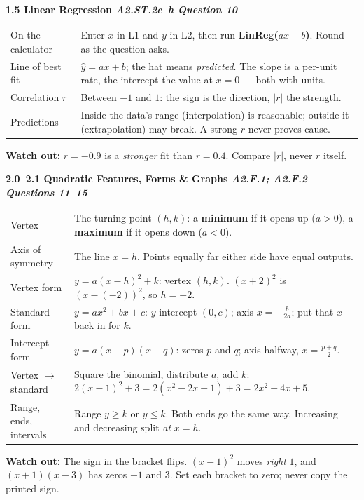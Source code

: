 \documentclass[10pt]{article}
\newcommand{\sghead}[2]{%
  \boxguard[10]%
  \vspace{4pt}\par\noindent
  \colorbox{forest}{\parbox{\dimexpr\linewidth-2\fboxsep}{%
    \small\color{white}\bfseries #1 \hfill \textmd{\itshape\scriptsize\color{forestmid} #2}}}%
  \vspace{2pt}\par}
\newcommand{\sgwatch}[1]{%
  \vspace{1pt}\par\noindent
  \colorbox{redbg}{\parbox{\dimexpr\linewidth-2\fboxsep}{%
    \footnotesize\textbf{\textcolor{redacc}{Watch out:}} #1}}%
  \vspace{1pt}\par}
\newcommand{\sgtabsetup}{\renewcommand{\arraystretch}{1.06}\footnotesize}
\begin{document}
\sghead{1.5 \quad Linear Regression}{A2.ST.2c--h \;\textbullet\; Question 10}
{\sgtabsetup
\begin{tabularx}{\linewidth}{@{} G X @{}}
On the calculator & Enter $x$ in L1 and $y$ in L2, then run \textbf{LinReg($ax+b$)}. Round as the
  question asks. \\
Line of best fit & $\hat y = ax+b$; the hat means \emph{predicted}. The slope is a per-unit rate,
  the intercept the value at $x=0$ --- both with units. \\
Correlation $r$ & Between $-1$ and $1$: the sign is the direction, $|r|$ the strength. \\
Predictions & Inside the data's range (interpolation) is reasonable; outside it (extrapolation)
  may break. A strong $r$ never proves cause. \\
\end{tabularx}}
\sgwatch{$r=-0.9$ is a \emph{stronger} fit than $r=0.4$. Compare $|r|$, never $r$ itself.}

\sghead{2.0--2.1 \quad Quadratic Features, Forms \& Graphs}{A2.F.1; A2.F.2 \;\textbullet\; Questions 11--15}
{\sgtabsetup
\begin{tabularx}{\linewidth}{@{} G X @{}}
Vertex & The turning point $(h,k)$: a \textbf{minimum} if it opens up ($a>0$), a
  \textbf{maximum} if it opens down ($a<0$). \\
Axis of symmetry & The line $x=h$. Points equally far either side have equal outputs. \\
Vertex form & $y=a(x-h)^2+k$: vertex $(h,k)$. $(x+2)^2$ is $(x-(-2))^2$, so $h=-2$. \\
Standard form & $y=ax^2+bx+c$: $y$-intercept $(0,c)$; axis $x=-\frac{b}{2a}$; put that $x$ back in
  for $k$. \\
Intercept form & $y=a(x-p)(x-q)$: zeros $p$ and $q$; axis halfway, $x=\frac{p+q}{2}$. \\
Vertex $\to$ standard & Square the binomial, distribute $a$, add $k$:
  $2(x-1)^2+3=2(x^2-2x+1)+3=2x^2-4x+5$. \\
Range, ends, intervals & Range $y\ge k$ or $y\le k$. Both ends go the same way. Increasing and
  decreasing split \emph{at} $x=h$. \\
\end{tabularx}}
\sgwatch{The sign in the bracket flips. $(x-1)^2$ moves \emph{right} $1$, and $(x+1)(x-3)$ has
zeros $-1$ and $3$. Set each bracket to zero; never copy the printed sign.}
\end{document}
